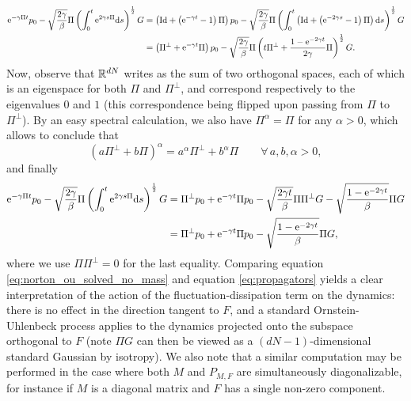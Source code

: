 \begin{equation}
    \begin{aligned}
        \mathrm{e}^{-\gamma \Pi t}p_0-\sqrt{\frac{2\gamma}{\beta}} \Pi\left(\int_0^t\mathrm{e}^{2\gamma s \Pi }\mathrm{d} s\right)^{\frac12}G&=\left(\mathrm{Id}+\left(\mathrm{e}^{-\gamma t}-1\right)\Pi\right)p_0-\sqrt{\frac{2\gamma}{\beta}}\Pi\left(\int_0^t\left(\mathrm{Id}+\left(\mathrm{e}^{-2\gamma s}-1\right)\Pi\right)\mathrm{d} s\right)^\frac{1}{2}G\\
        &=\left(\Pi^\perp +\mathrm{e}^{-\gamma t}\Pi\right)p_0-\sqrt{\frac{2\gamma}{\beta}}\Pi\left(t\Pi^\perp+\frac{1-\mathrm{e}^{-2\gamma t}}{2\gamma}\Pi\right)^{\frac 12}G.
    \end{aligned}
\end{equation}
Now, observe that $\mathbb{R}^{dN}$ writes as the sum of two orthogonal spaces, each of which is an eigenspace for both $\Pi$ and $\Pi^\perp$, and correspond respectively to the eigenvalues $0$ and $1$ (this correspondence being flipped upon passing from $\Pi$ to $\Pi^\perp$). By an easy spectral calculation, we also have $\Pi^\alpha=\Pi$ for any $\alpha>0$,
which allows to conclude that 
\[(a\Pi^\perp+b\Pi)^\alpha=a^\alpha\Pi^\perp+b^\alpha\Pi\qquad \forall\,a,b,\alpha>0,\]
and finally
\begin{equation}
    \label{eq:norton_ou_solved_no_mass}
    \begin{aligned}
    \mathrm{e}^{-\gamma \Pi t}p_0-\sqrt{\frac{2\gamma}{\beta}} \Pi\left(\int_0^t\mathrm{e}^{2\gamma s \Pi }\mathrm{d} s\right)^{\frac12}G&=\Pi^\perp p_0+\mathrm{e}^{-\gamma t}\Pi p_0-\sqrt{\frac{2\gamma t}{\beta}}\Pi\Pi^\perp G-\sqrt{\frac{1-\mathrm{e}^{-2\gamma t}}{\beta}}\Pi G\\
    &=\Pi^\perp p_0+\mathrm{e}^{-\gamma t}\Pi p_0-\sqrt{\frac{1-\mathrm{e}^{-2\gamma t}}{\beta}}\Pi G,
    \end{aligned}
\end{equation}
where we use $\Pi\Pi^\perp=0$ for the last equality.
Comparing equation \eqref{eq:norton_ou_solved_no_mass} and equation \eqref{eq:propagators} yields a clear interpretation of the action of the fluctuation-dissipation term on the dynamics: there is no effect in the direction tangent to $F$, and a standard Ornstein-Uhlenbeck process applies to the dynamics projected onto the subspace orthogonal to $F$ (note $\Pi G$ can then be viewed as a $(dN-1)$-dimensional standard Gaussian by isotropy).
We also note that a similar computation may be performed in the case where both $M$ and $P_{M,F}$ are simultaneously diagonalizable, for instance if $M$ is a diagonal matrix and $F$ has a single non-zero component.

